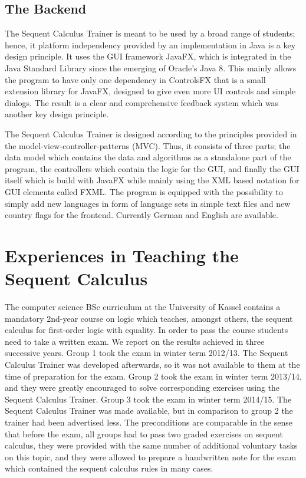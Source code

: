 \documentclass[a4paper,UKenglish]{lipics}
\begin{document}
\subsection{The Backend} 

The Sequent Calculus Trainer is meant to be used by a broad range of students; hence, it platform independency provided by an implementation in Java is a
key design principle. It uses the GUI framework JavaFX, which is integrated in the Java Standard Library since the emerging of Oracle's Java 8. This mainly
allows the program to have only one dependency in ControlsFX that is a small extension library for JavaFX, designed to give even more UI controls and
simple dialogs. The result is a clear and comprehensive feedback system which was another key design principle.

The Sequent Calculus Trainer is designed according to the principles provided in the model-view-controller-patterns (MVC). Thus, it consists of three
parts; the data model which contains the data and algorithms as a standalone part of the program, the controllers which contain the logic for the GUI,
and finally the GUI itself which is build with JavaFX while mainly using the XML based notation for GUI elements called FXML. 
The program is equipped with the possibility to simply add new languages in form of language sets in simple text files and new country flags for the 
frontend. Currently German and English are available. 


\section{Experiences in Teaching the Sequent Calculus}
\label{sec:empirical}


The computer science BSc curriculum at the University of Kassel contains a mandatory 2nd-year course on logic which teaches, amongst others, the sequent
calculus for first-order logic with equality. In order to pass the course students need to take a written exam. We report on the results achieved in
three successive years. Group 1 took the exam in winter term 2012/13. The Sequent Calculus Trainer was developed afterwards, so it was not available to
them at the time of preparation for the exam. Group 2 took the exam in winter term 2013/14, and they were greatly encouraged to solve corresponding
exercises using the Sequent Calculus Trainer. Group 3 took the exam in winter term 2014/15. The Sequent Calculus Trainer was made available, but in
comparison to group 2 the trainer had been advertised less. The preconditions are comparable in the sense that before the exam, all groups had to
pass two graded exercises on sequent calculus, they were provided with the same number of additional voluntary tasks on this topic, and they were allowed
to prepare a handwritten note for the exam which contained the sequent calculus rules in many cases.
\end{document}
